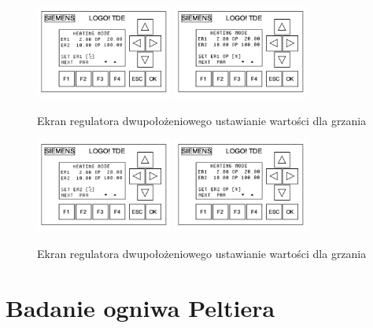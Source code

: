 \documentclass[oneside]{mgr}
\begin{document}
\begin{center}
\begin{figure}[h!]
    \centering
    \includegraphics[width=0.40\textwidth]{Ekran70.jpg}
    \includegraphics[width=0.40\textwidth]{Ekran71.jpg}
    \caption{Ekran regulatora dwupołożeniowego ustawianie wartości dla grzania}
    \end{figure}
\end{center}
\begin{center}
\begin{figure}[h!]
    \centering
    \includegraphics[width=0.40\textwidth]{Ekran72.jpg}
    \includegraphics[width=0.40\textwidth]{Ekran73.jpg}
    \caption{Ekran regulatora dwupołożeniowego ustawianie wartości dla grzania}
    \end{figure}
\end{center}

\chapter{Badanie ogniwa Peltiera}
\end{document}
